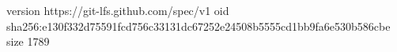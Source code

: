 version https://git-lfs.github.com/spec/v1
oid sha256:e130f332d75591fcd756c33131dc67252e24508b5555cd1bb9fa6e530b586cbe
size 1789

